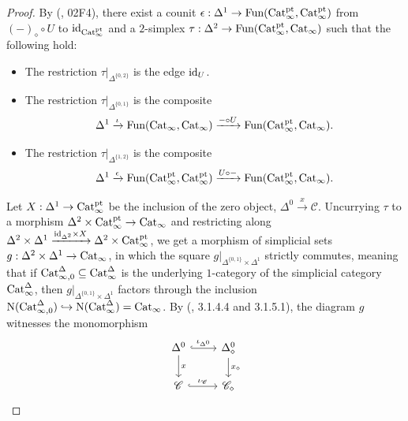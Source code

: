 \documentclass{tac}
\newcommand{\s}[1]{\mathscr{#1}}
\newcommand{\tx}[1]{\textnormal{#1}}
\begin{document}
\begin{proof}
By (\cite{kerodon}, 02F4), there exist a counit $\epsilon : \Delta^1 \to \tx{Fun}(\tx{Cat}_\infty^\tx{pt} , \tx{Cat}_\infty^\tx{pt})$ from $(-)_\diamond \circ U$ to $\tx{id}_{\tx{Cat}_\infty^\tx{pt}}$ and a $2$-simplex $\tau : \Delta^2 \to \tx{Fun}(\tx{Cat}_\infty^{\tx{pt}}, \tx{Cat}_\infty)$ such that the following hold:
\begin{itemize}
\item The restriction $\tau |_{\Delta^{\{0,2 \}}}$ is the edge $\tx{id}_U$.
\item The restriction $\tau |_{\Delta^{\{0,1 \}}}$ is the composite
\[ \Delta^1 \xrightarrow{\iota} \tx{Fun}(\tx{Cat}_\infty , \tx{Cat}_\infty) \xrightarrow{-\circ U} \tx{Fun}(\tx{Cat}_\infty^\tx{pt} , \tx{Cat}_\infty). \]
\item The restriction $\tau |_{\Delta^{\{1,2 \}}}$ is the composite
\[ \Delta^1 \xrightarrow{\epsilon} \tx{Fun}(\tx{Cat}_\infty^\tx{pt} , \tx{Cat}_\infty^\tx{pt}) \xrightarrow{U\circ -} \tx{Fun}(\tx{Cat}_\infty^\tx{pt} , \tx{Cat}_\infty).  \]
\end{itemize}
Let $X : \Delta^1 \to \tx{Cat}_\infty^\tx{pt}$ be the inclusion of the zero object, $\Delta^0 \xrightarrow{x}\s{C}$. Uncurrying $\tau$ to a morphism $\Delta^2 \times \tx{Cat}_\infty^\tx{pt} \to \tx{Cat}_\infty$ and restricting along $\Delta^2 \times \Delta^1 \xrightarrow{\tx{id}_{\Delta^2} \times X} \Delta^2 \times \tx{Cat}_\infty^\tx{pt}$, we get a morphism of simplicial sets $g : \Delta^2 \times \Delta^1 \to \tx{Cat}_\infty$, in which the square $g|_{\Delta^{\{0,1 \}} \times \Delta^1}$ strictly commutes, meaning that if $\tx{Cat}_{\infty, 0}^{\Delta}\subseteq \tx{Cat}_\infty^{\Delta}$ is the underlying $1$-category of the simplicial category $\tx{Cat}_\infty^{\Delta}$, then $g|_{\Delta^{\{0,1 \}} \times \Delta^1}$ factors through the inclusion $\tx{N}(\tx{Cat}_{\infty, 0}^{\Delta} )\hookrightarrow \tx{N}( \tx{Cat}_{\infty}^{\Delta} ) = \tx{Cat}_\infty$.  By (\cite{htt}, 3.1.4.4 and 3.1.5.1), the diagram $g$ witnesses the monomorphism 
\begin{equation}\label{sectiondiamondzeroobjmono}\begin{tikzcd}
\Delta^0 \arrow[]{d}{x} \arrow[hook]{r}{\iota_{\Delta^0}} & \Delta^0_\diamond \arrow[]{d}{x_\diamond} \\
\s{C} \arrow[hook]{r}{\iota_{\s{C}}} & \s{C}_\diamond 
\end{tikzcd}\end{equation}

\end{proof}
\end{document}
